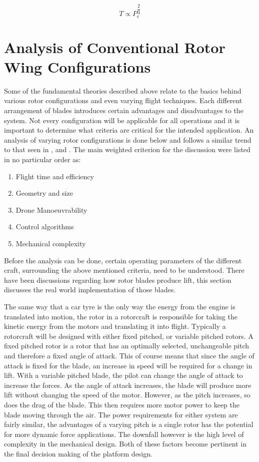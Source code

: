	\begin{equation*}
	T \propto P_e^{\dfrac{2}{3}}
	\end{equation*}

\section{Analysis of Conventional Rotor Wing Configurations}\label{SECT_RotorConfig}

Some of the fundamental theories described above relate to the basics behind various rotor configurations and even varying flight techniques. Each different arrangement of blades introduces certain advantages and disadvantages to the system. Not every configuration will be applicable for all operations and it is important to determine what criteria are critical for the intended application.  An analysis of varying rotor configurations is done below and follows a similar trend to that seen in \cite{RotorConfig}, \cite{Bohorquez} and \cite{NewMAV}. The main weighted criterion for the discussion were listed in no particular order as:

\begin{enumerate}
	\item Flight time and efficiency
	\item Geometry and size
	\item Drone Manoeuvrability
	\item Control algorithms
	\item Mechanical complexity
\end{enumerate}

Before the analysis can be done, certain operating parameters of the different craft, surrounding the above mentioned criteria, need to be understood. There have been discussions regarding how rotor blades produce lift, this section discusses the real world implementation of those blades.


The same way that a car tyre is the only way the energy from the engine is translated into motion, the rotor in a rotorcraft is responsible for taking the kinetic energy from the motors and translating it into flight. Typically a rotorcraft will be designed with either fixed pitched, or variable pitched rotors. A fixed pitched rotor is a rotor that has an optimally selected, unchangeable pitch and therefore a fixed angle of attack. This of course means that since the angle of attack is fixed for the blade, an increase in speed will be required for a change in lift. With a variable pitched blade, the pilot can change the angle of attack to increase the forces. As the angle of attack increases, the blade will produce more lift without changing the speed of the motor. However, as the pitch increases, so does the drag of the blade. This then requires more motor power to keep the blade moving through the air.
The power requirements for either system are fairly similar, the advantages of a varying pitch is a single rotor has the potential for more dynamic force applications. The downfall however is the high level of complexity in the mechanical design. Both of these factors become pertinent in the final decision making of the platform design.

